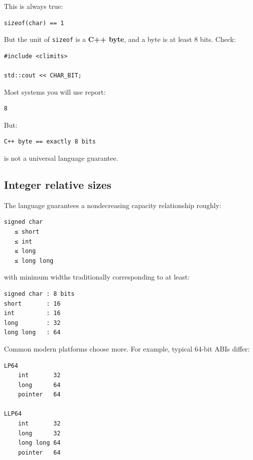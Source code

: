 \hypertarget{05-engine-i-ch002-what-the-standard-does-guarantee}{}

This is always true:

\begin{verbatim}
sizeof(char) == 1
\end{verbatim}

But the unit of \texttt{sizeof} is a \textbf{C++ byte}, and a byte is at least 8 bits. Check:

\begin{verbatim}
#include <climits>

std::cout << CHAR_BIT;
\end{verbatim}

Most systems you will use report:

\begin{verbatim}
8
\end{verbatim}

But:

\begin{verbatim}
C++ byte == exactly 8 bits
\end{verbatim}

is not a universal language guarantee.

\subsection{Integer relative sizes}\label{05-engine-i-ch002-integer-relative-sizes}

\hypertarget{05-engine-i-ch002-integer-relative-sizes}{}

The language guarantees a nondecreasing capacity relationship roughly:

\begin{verbatim}
signed char
   ≤ short
   ≤ int
   ≤ long
   ≤ long long
\end{verbatim}

with minimum widths traditionally corresponding to at least:

\begin{verbatim}
signed char : 8 bits
short       : 16
int         : 16
long        : 32
long long   : 64
\end{verbatim}

Common modern platforms choose more. For example, typical 64-bit ABIs differ:

\begin{verbatim}
LP64
    int       32
    long      64
    pointer   64

LLP64
    int       32
    long      32
    long long 64
    pointer   64
\end{verbatim}


